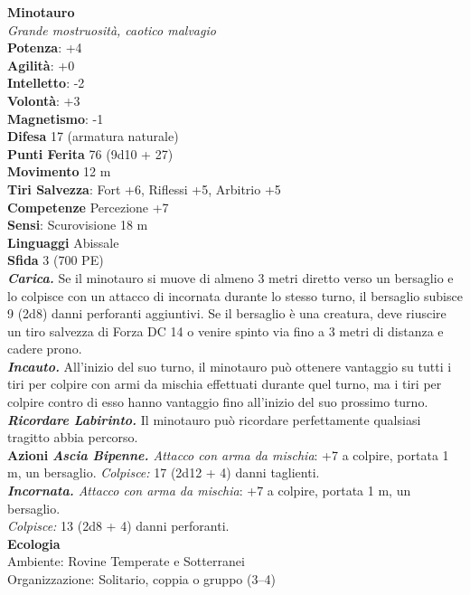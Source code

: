 \begin{multicols}{2}
\medskip\textbf{Minotauro}\\
\emph{Grande mostruosità, caotico malvagio}\\
\textbf{Potenza}: +4\\
\textbf{Agilità}: +0\\
\textbf{Intelletto}: -2\\
\textbf{Volontà}: +3\\
\textbf{Magnetismo}: -1\\
\textbf{Difesa} 17 (armatura naturale)\\
\textbf{Punti Ferita} 76 (9d10 + 27)\\
\textbf{Movimento} 12 m\\
\textbf{Tiri Salvezza}: Fort +6, Riflessi +5, Arbitrio +5\\
\textbf{Competenze} Percezione +7\\
\textbf{Sensi}: Scurovisione 18 m\\
\textbf{Linguaggi} Abissale\\
\textbf{Sfida} 3 (700 PE)\smallskip\\
\emph{\textbf{Carica.}} Se il minotauro si muove di almeno 3 metri diretto verso un bersaglio e lo colpisce con un attacco di incornata durante lo stesso turno, il bersaglio subisce 9 (2d8) danni perforanti aggiuntivi. Se il bersaglio è una creatura, deve riuscire un tiro salvezza di Forza DC 14 o venire spinto via fino a 3 metri di distanza e cadere prono.\\
\emph{\textbf{Incauto.}} All'inizio del suo turno, il minotauro può ottenere vantaggio su tutti i tiri per colpire con armi da mischia effettuati durante quel turno, ma i tiri per colpire contro di esso hanno vantaggio fino all'inizio del suo prossimo turno.\\
\emph{\textbf{Ricordare Labirinto.}} Il minotauro può ricordare perfettamente qualsiasi tragitto abbia percorso.\\
\smallskip\textbf{Azioni}  
\emph{\textbf{Ascia Bipenne.} Attacco con arma da mischia}: +7 a colpire, portata 1 m, un bersaglio.
\emph{Colpisce:} 17 (2d12 + 4) danni taglienti.\\
\emph{\textbf{Incornata.} Attacco con arma da mischia}: +7 a colpire, portata 1 m, un bersaglio.\\
\emph{Colpisce:} 13 (2d8 + 4) danni perforanti.\\
\textbf{Ecologia}\\
Ambiente: Rovine Temperate e Sotterranei\\
Organizzazione: Solitario, coppia o gruppo (3–4)\\

\end{multicols}
